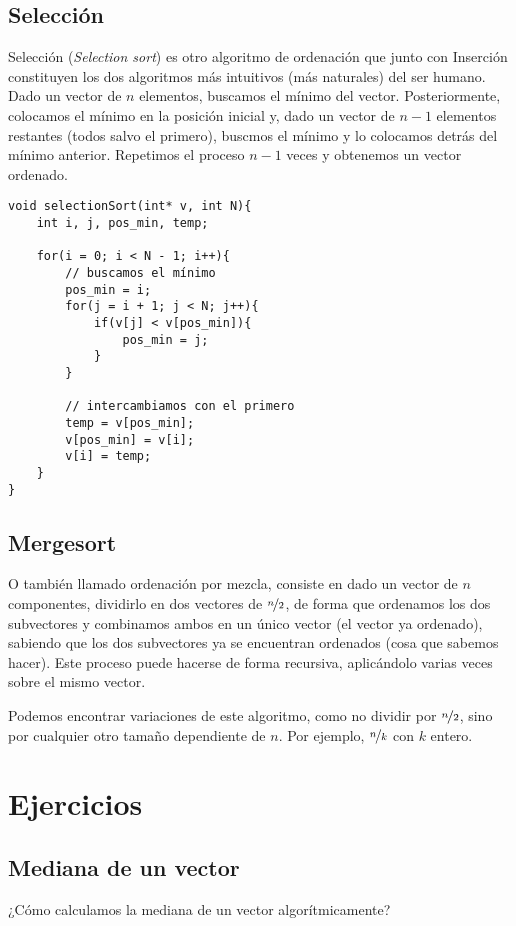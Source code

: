 \subsection{Selección} 
Selección (\emph{Selection sort}) es otro algoritmo de ordenación que junto con Inserción constituyen los dos algoritmos más intuitivos (más naturales) del ser humano. Dado un vector de $n$ elementos, buscamos el mínimo del vector. Posteriormente, colocamos el mínimo en la posición inicial y, dado un vector de $n-1$ elementos restantes (todos salvo el primero), buscmos el mínimo y lo colocamos detrás del mínimo anterior. Repetimos el proceso $n-1$ veces y obtenemos un vector ordenado.
    \begin{verbatim}
void selectionSort(int* v, int N){
    int i, j, pos_min, temp;

    for(i = 0; i < N - 1; i++){
        // buscamos el mínimo
        pos_min = i;
        for(j = i + 1; j < N; j++){
            if(v[j] < v[pos_min]){
                pos_min = j;
            }
        }

        // intercambiamos con el primero
        temp = v[pos_min];
        v[pos_min] = v[i];
        v[i] = temp;
    }
}
    \end{verbatim}

\subsection{Mergesort}
O también llamado ordenación por mezcla, consiste en dado un vector de $n$ componentes, dividirlo en dos vectores de $\nicefrac{n}{2}$, de forma que ordenamos los dos subvectores y combinamos ambos en un único vector (el vector ya ordenado), sabiendo que los dos subvectores ya se encuentran ordenados (cosa que sabemos hacer). Este proceso puede hacerse de forma recursiva, aplicándolo varias veces sobre el mismo vector.

Podemos encontrar variaciones de este algoritmo, como no dividir por $\nicefrac{n}{2}$, sino por cualquier otro tamaño dependiente de $n$. Por ejemplo, $\nicefrac{n}{k}$ con $k$ entero.

\section{Ejercicios}
\subsection{Mediana de un vector}
\begin{ejercicio*}
    ¿Cómo calculamos la mediana de un vector algorítmicamente?

\end{ejercicio*}

